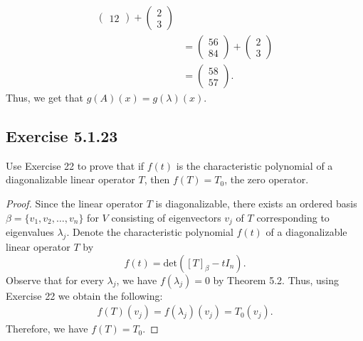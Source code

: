 \begin{enumerate}
\begin{solution}
\begin{align*}
\begin{pmatrix}
                                             12
                                            \end{pmatrix} + \begin{pmatrix} 
                                                       2 \\
                                                       3
                                                      \end{pmatrix} \\
                                &= \begin{pmatrix} 
                                           56 \\
                                           84
                                          \end{pmatrix} + \begin{pmatrix} 
                                                     2 \\
                                                     3
                                                    \end{pmatrix} \\
                                &= \begin{pmatrix} 
                                           58 \\
                                           57
                                          \end{pmatrix}. 
            \end{align*}
            Thus, we get that \( g(A)(x) = g(\lambda)(x) \).
              \end{solution}
\end{enumerate}

\subsection*{Exercise 5.1.23} Use Exercise 22 to prove that if \( f(t)  \) is the characteristic polynomial of a diagonalizable linear operator \( T  \), then \( f(T) = {T}_{0} \), the zero operator. 

\begin{proof}
Since the linear operator \( T \) is diagonalizable, there exists an ordered basis \( \beta = \{ {v}_{1}, {v}_{2}, \dots, {v}_{n} \}  \) for \( V  \) consisting of eigenvectors \( {v}_{j} \) of \( T  \) corresponding to eigenvalues \( {\lambda}_{j} \). Denote the characteristic polynomial \( f(t)  \) of a diagonalizable linear operator \( T  \) by
\[  f(t) = \text{det}([T]_{\beta} - t {I}_{n} ). \]
Observe that for every \( {\lambda}_{j} \), we have \( f(\lambda_{j}) = 0  \) by Theorem 5.2. Thus, using Exercise 22 we obtain the following:
\begin{align*}
    f(T)({v}_{j}) = f({\lambda}_{j})({v}_{j}) 
                  = {T}_{0}({v}_{j}).
\end{align*}
Therefore, we have \( f(T) = {T}_{0} \).
\end{proof}


